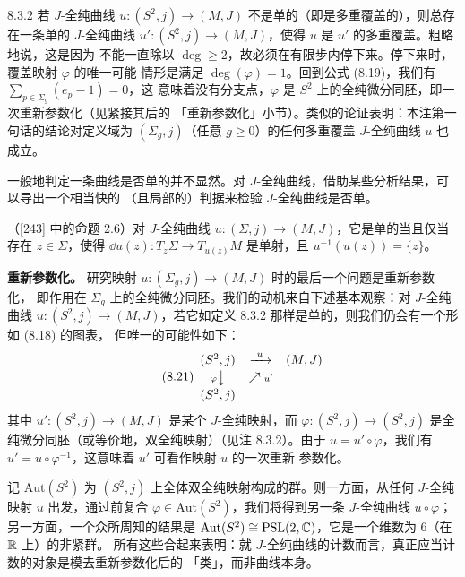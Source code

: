\begin{wrem}{8.3.2}
  若 $J$-全纯曲线 $u\colon(S^2,j)\to(M,J)$ 不是单的（即是多重覆盖的），则总存在一条单的
  $J$-全纯曲线 $u'\colon(S^2,j)\to(M,J)$，使得 $u$ 是 $u'$ 的多重覆盖。粗略地说，这是因为
  不能一直除以 $\deg\geqslant2$，故必须在有限步内停下来。停下来时，覆盖映射 $\varphi$ 的唯一可能
  情形是满足 $\deg(\varphi)=1$。回到公式 (8.19)，我们有 $\sum_{p\in\Sigma_g}(e_p-1)=0$，这
  意味着没有分支点，$\varphi$ 是 $S^2$ 上的全纯微分同胚，即一次重新参数化（见紧接其后的
  「重新参数化」小节）。类似的论证表明：本注第一句话的结论对定义域为 $(\Sigma_g,j)$（任意
  $g\geqslant0$）的任何多重覆盖 $J$-全纯曲线 $u$ 也成立。
\end{wrem}

一般地判定一条曲线是否单的并不显然。对 $J$-全纯曲线，借助某些分析结果，可以导出一个相当快的
（且局部的）判据来检验 $J$-全纯曲线是否单。

（[243] 中的命题 2.6）\quad 对 $J$-全纯曲线
$u\colon(\Sigma,j)\to(M,J)$，它是单的当且仅当存在 $z\in\Sigma$，使得
$\dd u(z)\colon T_z\Sigma\to T_{u(z)}M$ 是单射，且 $u^{-1}(u(z))=\{z\}$。

\textbf{重新参数化。} 研究映射 $u\colon(\Sigma_g,j)\to(M,J)$ 时的最后一个问题是重新参数化，
即作用在 $\Sigma_g$ 上的全纯微分同胚。我们的动机来自下述基本观察：对 $J$-全纯曲线
$u\colon(S^2,j)\to(M,J)$，若它如定义 8.3.2 那样是单的，则我们仍会有一个形如 (8.18) 的图表，
但唯一的可能性如下：
\begin{equation}\tag{8.21}
\begin{array}{ccc}
  (S^2,j) & \xrightarrow{\ u\ } & (M,J)\\[2pt]
  {\scriptstyle\varphi}\big\downarrow & \nearrow{\scriptstyle u'} & \\[2pt]
  (S^2,j) & &
\end{array}
\end{equation}
其中 $u'\colon(S^2,j)\to(M,J)$ 是某个 $J$-全纯映射，而
$\varphi\colon(S^2,j)\to(S^2,j)$ 是全纯微分同胚（或等价地，双全纯映射）（见注 8.3.2）。由于
$u=u'\circ\varphi$，我们有 $u'=u\circ\varphi^{-1}$，这意味着 $u'$ 可看作映射 $u$ 的一次重新
参数化。

记 $\mathrm{Aut}(S^2)$ 为 $(S^2,j)$ 上全体双全纯映射构成的群。则一方面，从任何 $J$-全纯映射
$u$ 出发，通过前复合 $\varphi\in\mathrm{Aut}(S^2)$，我们将得到另一条 $J$-全纯曲线
$u\circ\varphi$；另一方面，一个众所周知的结果是
$\mathrm{Aut}(S^2)\cong\mathrm{PSL}(2,\mathbb{C})$，它是一个维数为 $6$（在 $\mathbb{R}$ 上）的非紧群。
所有这些合起来表明：就 $J$-全纯曲线的计数而言，真正应当计数的对象是模去重新参数化后的
「类」，而非曲线本身。

